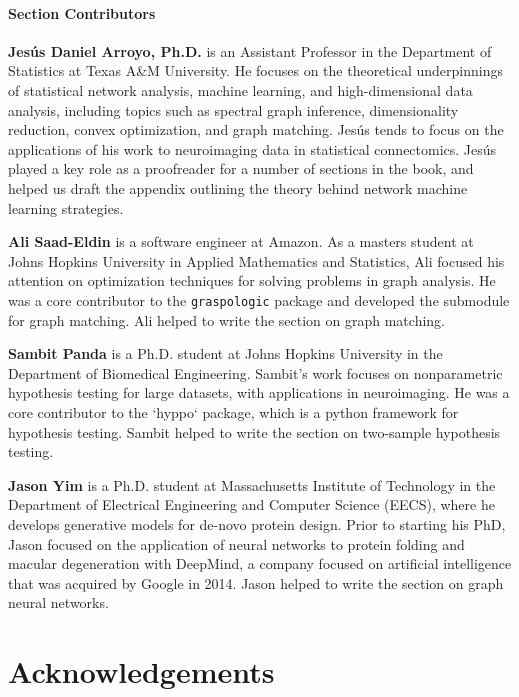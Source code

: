 \paragraph{Section Contributors}

\textbf{Jes{\'u}s Daniel Arroyo, Ph.D.} is an Assistant Professor in the Department of Statistics at Texas A\&M University. He focuses on the theoretical underpinnings of statistical network analysis, machine learning, and high-dimensional data analysis, including topics such as spectral graph inference, dimensionality reduction, convex optimization, and graph matching. Jes\'us tends to focus on the applications of his work to neuroimaging data in statistical connectomics. Jes\'us played a key role as a proofreader for a number of sections in the book, and helped us draft the appendix outlining the theory behind network machine learning strategies.

\noindent\textbf{Ali Saad-Eldin} is a software engineer at Amazon. As a masters student at Johns Hopkins University in Applied Mathematics and Statistics, Ali focused his attention on optimization techniques for solving problems in graph analysis. He was a core contributor to the \texttt{graspologic} package and developed the submodule for graph matching. Ali helped to write the section on graph matching.

\noindent\textbf{Sambit Panda} is a Ph.D. student at Johns Hopkins University in the Department of Biomedical Engineering. Sambit's work focuses on nonparametric hypothesis testing for large datasets, with applications in neuroimaging. He was a core contributor to the `hyppo` package, which is a python framework for hypothesis testing. Sambit helped to write the section on two-sample hypothesis testing.

\noindent\textbf{Jason Yim} is a Ph.D. student at Massachusetts Institute of Technology in the Department of Electrical Engineering and Computer Science (EECS), where he develops generative models for de-novo protein design. Prior to starting his PhD, Jason focused on the application of neural networks to protein folding and macular degeneration with DeepMind, a company focused on artificial intelligence that was acquired by Google in 2014. Jason helped to write the section on graph neural networks.

\section*{Acknowledgements}

